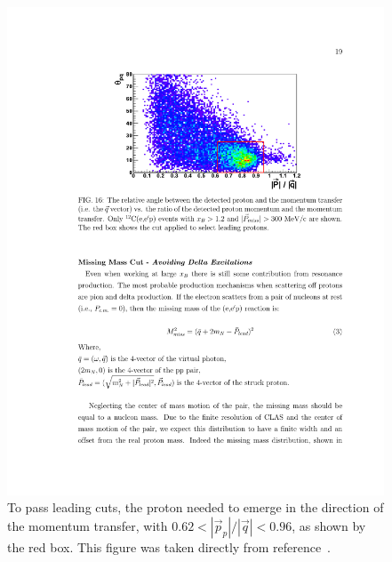 \documentclass{article}
\begin{document}
\begin{figure}[htpb]
\centering
\includegraphics{or_note_figs/leading_selection.pdf}
\caption[$|\vec{p}_p|/|\vec{q}|$ and $\theta_{pq}$ cuts for leading protons]{
To pass leading cuts, the proton needed to emerge in the direction of the
momentum transfer, with $0.62 < |\vec{p}_p|/|\vec{q}| < 0.96$, as shown by the red
box. This figure was taken directly from reference~\cite{Or:note}.
\label{fig:p_over_q}}
\end{figure}
\end{document}
